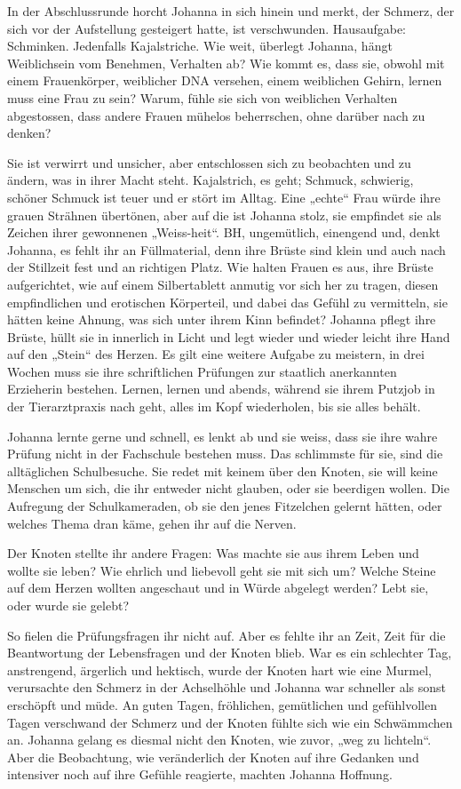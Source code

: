 \documentclass[10pt,titlepage,a5paper]{book}
\begin{document}
In der Abschlussrunde horcht Johanna in sich hinein und merkt, der Schmerz, der sich vor der Aufstellung gesteigert hatte, ist verschwunden.
Hausaufgabe: Schminken. Jedenfalls Kajalstriche. Wie weit, überlegt Johanna, hängt Weiblichsein vom Benehmen, Verhalten ab? Wie kommt es, dass sie, obwohl mit einem Frauenkörper, weiblicher DNA versehen, einem weiblichen Gehirn, lernen muss eine Frau zu sein? Warum, fühle sie sich von weiblichen Verhalten abgestossen, dass andere Frauen mühelos beherrschen, ohne darüber nach zu denken?

Sie ist verwirrt und unsicher, aber entschlossen sich zu beobachten und zu ändern, was in ihrer Macht steht. Kajalstrich, es geht; Schmuck, schwierig, schöner Schmuck ist teuer und er stört im Alltag. Eine „echte“ Frau würde ihre grauen Strähnen übertönen, aber auf die ist Johanna stolz, sie empfindet sie als Zeichen ihrer gewonnenen „Weiss-heit“. BH, ungemütlich, einengend und, denkt Johanna, es  fehlt ihr an Füllmaterial, denn ihre Brüste sind klein und auch nach der Stillzeit fest und an richtigen Platz. Wie halten Frauen es aus, ihre Brüste aufgerichtet, wie auf einem Silbertablett anmutig vor sich her zu tragen, diesen empfindlichen und erotischen Körperteil, und dabei das Gefühl zu vermitteln, sie hätten keine Ahnung, was sich unter ihrem Kinn befindet?
Johanna pflegt ihre Brüste, hüllt sie in innerlich in Licht und legt wieder und wieder leicht ihre Hand auf den „Stein“ des Herzen. Es gilt eine weitere Aufgabe zu meistern, in drei Wochen muss sie ihre schriftlichen Prüfungen zur staatlich anerkannten Erzieherin bestehen.  Lernen, lernen und abends, während sie ihrem Putzjob in der Tierarztpraxis nach geht, alles im Kopf wiederholen, bis sie alles behält.

Johanna lernte gerne und schnell, es lenkt ab und sie weiss, dass sie ihre wahre Prüfung nicht in der Fachschule bestehen muss. Das schlimmste für sie, sind die alltäglichen Schulbesuche. Sie redet mit keinem über den Knoten, sie will keine Menschen um sich, die ihr entweder nicht glauben, oder sie beerdigen wollen. Die Aufregung der Schulkameraden, ob sie den jenes Fitzelchen gelernt hätten, oder welches Thema dran käme, gehen ihr auf die Nerven. 

Der Knoten stellte ihr andere Fragen: Was machte sie aus ihrem Leben und wollte sie leben? Wie ehrlich und liebevoll geht sie mit sich um? Welche Steine auf dem Herzen wollten angeschaut und in Würde abgelegt werden? Lebt sie, oder wurde sie gelebt?

So fielen die Prüfungsfragen ihr nicht auf. Aber es fehlte ihr an Zeit, Zeit für die Beantwortung der Lebensfragen und der Knoten blieb. War es ein schlechter Tag, anstrengend, ärgerlich und hektisch, wurde der Knoten hart wie eine Murmel, verursachte den Schmerz in der Achselhöhle und Johanna war schneller als sonst erschöpft und müde. An guten Tagen, fröhlichen, gemütlichen und gefühlvollen Tagen verschwand der Schmerz und der Knoten fühlte sich wie ein Schwämmchen an. Johanna gelang es diesmal nicht den Knoten, wie zuvor, „weg zu lichteln“. Aber die Beobachtung, wie veränderlich der Knoten auf ihre Gedanken und intensiver noch auf ihre Gefühle reagierte, machten Johanna Hoffnung.
\end{document}
